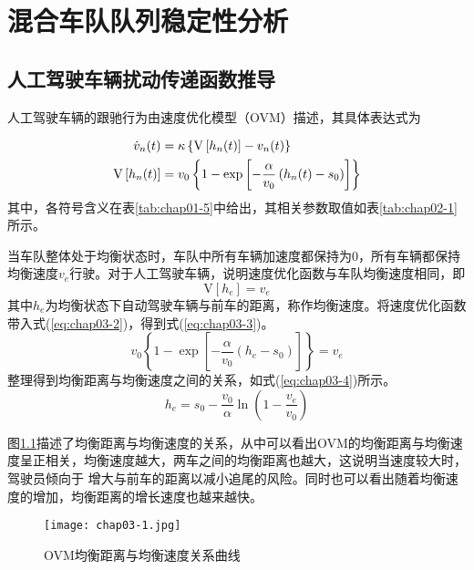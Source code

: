 
\chapter{混合车队队列稳定性分析}
\label{sec:3}

\section{人工驾驶车辆扰动传递函数推导}

人工驾驶车辆的跟驰行为由速度优化模型（OVM）描述，其具体表达式为

\begin{align}
  \dot{v}_n(t) &= \kappa \left\{ \mathrm{V} \left[ h_n(t) \right] - v_n(t) \right\} \notag \\
  \mathrm{V} \left[ h_n(t) \right] &= v_0 \left\{ 1 - \exp \left[ - \frac{\alpha}{v_0}\left(h_n(t)-s_0\right) \right] \right\}
  \label{eq:chap03-1}
\end{align}
其中，各符号含义在表\ref{tab:chap01-5}中给出，其相关参数取值如表\ref{tab:chap02-1}所示。

当车队整体处于均衡状态时，车队中所有车辆加速度都保持为0，所有车辆都保持均衡速度$v_e$行驶。对于人工驾驶车辆，说明速度优化函数与车队均衡速度相同，即
\begin{equation}
  \mathrm{V}[h_e] = v_e
  \label{eq:chap03-2}
\end{equation}
其中$h_e$为均衡状态下自动驾驶车辆与前车的距离，称作均衡速度。将速度优化函数带入式(\ref{eq:chap03-2})，得到式(\ref{eq:chap03-3})。
\begin{equation}
  v_0 \left\{ 1 - \exp \left[ -\frac{\alpha}{v_0} (h_e - s_0) \right] \right\} = v_e
  \label{eq:chap03-3}
\end{equation}
整理得到均衡距离与均衡速度之间的关系，如式(\ref{eq:chap03-4})所示。
\begin{equation}
  h_e = s_0 - \frac{v_0}{\alpha}\ln\left( 1 - \frac{v_e}{v_0} \right)
  \label{eq:chap03-4}
\end{equation}

图\ref{fig:chap03-1}描述了均衡距离与均衡速度的关系，从中可以看出OVM的均衡距离与均衡速度呈正相关，均衡速度越大，两车之间的均衡距离也越大，这说明当速度较大时，驾驶员倾向于
增大与前车的距离以减小追尾的风险。同时也可以看出随着均衡速度的增加，均衡距离的增长速度也越来越快。

\begin{figure}
  \centering
  \texttt{[image: chap03-1.jpg]}
  \caption{OVM均衡距离与均衡速度关系曲线}
  \label{fig:chap03-1}
\end{figure}

